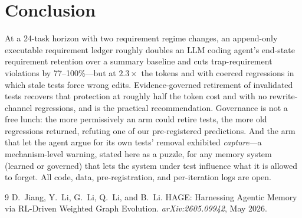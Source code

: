 \documentclass[11pt]{article}
\begin{document}
\section{Conclusion}

At a 24-task horizon with two requirement regime changes, an append-only
executable requirement ledger roughly doubles an LLM coding agent's end-state
requirement retention over a summary baseline and cuts trap-requirement
violations by 77--100\%---but at $2.3\times$ the tokens and with coerced
regressions in which stale tests force wrong edits. Evidence-governed
retirement of invalidated tests recovers that protection at roughly half the
token cost and with no rewrite-channel regressions, and is the practical
recommendation. Governance is not a free lunch: the more permissively an arm
could retire tests, the more old regressions returned, refuting one of our
pre-registered predictions. And the arm that let the agent argue for its own
tests' removal exhibited \emph{capture}---a mechanism-level warning, stated
here as a puzzle, for any memory system (learned or governed) that lets the
system under test influence what it is allowed to forget. All code, data,
pre-registration, and per-iteration logs are open.

\begin{thebibliography}{9}
D.~Jiang, Y.~Li, G.~Li, Q.~Li, and B.~Li.
\newblock HAGE: Harnessing Agentic Memory via RL-Driven Weighted Graph
Evolution.
\newblock \emph{arXiv:2605.09942}, May 2026.
\end{thebibliography}
\end{document}
